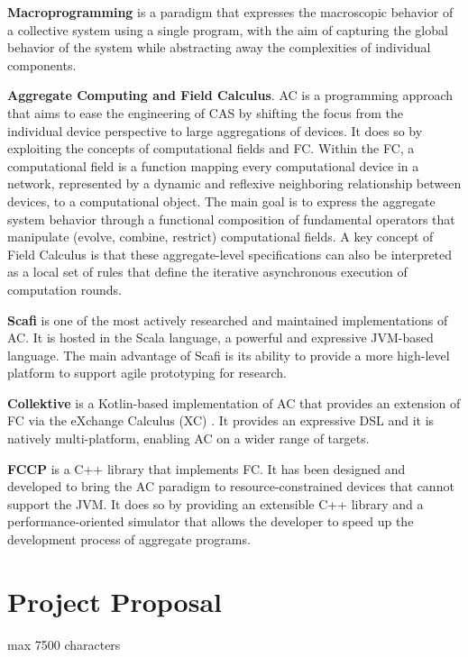 \documentclass[12pt]{article}
\begin{document}
\textbf{Macroprogramming}\cite{10.1145/3579353} is a paradigm that expresses the macroscopic behavior of a collective system using a single program, with the aim of
capturing the global behavior of the system while abstracting away the complexities of individual components.

\textbf{Aggregate Computing and Field Calculus}. AC\cite{beal2016aggregate} is a programming approach that aims to ease the engineering of CAS by shifting the
focus from the individual device perspective to large aggregations of devices. It does so by exploiting the concepts of computational fields and FC.
Within the FC, a computational field is a function mapping every computational device in a network, represented by a dynamic and reflexive neighboring
relationship between devices, to a computational object. The main goal is to express the aggregate system behavior
through a functional composition of fundamental operators that manipulate (evolve, combine, restrict)
computational fields. A key concept of Field Calculus is that these aggregate-level specifications can
also be interpreted as a local set of rules that define the iterative asynchronous
execution of computation rounds.

\textbf{Scafi}\cite{casadei2016towards} is one of the most actively researched and maintained implementations of
AC. It is hosted in the Scala language, a powerful and expressive JVM-based
language. The main advantage of Scafi is its ability to provide a
more high-level platform to support agile prototyping for research.

\textbf{Collektive} is a Kotlin-based implementation of AC that provides an extension of FC via the eXchange Calculus (XC) \cite{audrito2024exchange}.
It provides an expressive DSL and it is natively multi-platform, enabling AC on a wider range of targets.

\textbf{FCCP}\cite{audrito2024fcpp} is a C++ library that implements FC. It has been designed and developed to bring the AC paradigm to
resource-constrained devices that cannot support the JVM. It does so by providing an extensible C++ library and a performance-oriented simulator that allows
the developer to speed up the development process of aggregate programs.

\newpage
\section{Project Proposal}
max 7500 characters
\end{document}
